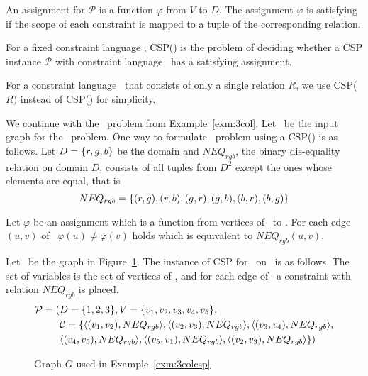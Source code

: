 An assignment for \(\mathcal{P}\) is a function \(\varphi\) from \(V\) to \(D\)\@. The assignment
\(\varphi\) is satisfying if the scope of each constraint is
mapped to a tuple of the corresponding relation.

\begin{defi}
For a fixed constraint language \mrelset, CSP(\mrelset) is the problem of deciding 
whether a CSP instance \(\mathcal{P}\) with constraint language \mrelset\
has a satisfying assignment.
\end{defi}

For a constraint language \mrelset\ that consists of only a single relation \(R\),
we use CSP(\(R)\) instead of CSP(\mrelset) for simplicity.

\begin{example}[\tcoloring]\label{exm:3colcsp}
We continue with the \tcoloring\ problem from Example~\ref{exm:3col}.
Let \mG\ be the input graph for the \tcoloring\ problem.
One way to formulate \tcoloring\ problem using a CSP(\mrelset) is as follows.
Let \(D=\{{r,g,b}\}\) be the domain and \(NEQ_{rgb}\), the binary dis-equality relation on domain \(D\)\@, consists of all tuples from \(D^2\) except the ones whose elements are equal, that is
\[NEQ_{rgb}=\{{(r,g),(r,b),(g,r),(g,b),(b,r), (b,g)}\}\]

Let \(\varphi\) be an assignment which is a function from vertices of \mG\ to \mD\@.
For each edge \((u,v)\) of \mG\, \(\varphi(u)\neq\varphi(v)\) holds which is
equivalent to \(NEQ_{rgb}(u,v)\)\@.

Let \mG\ be the graph in Figure~\ref{fig:sample}. The instance of 
CSP for \tcoloring\ on \mG\ is as follows. The set of variables is the set of vertices of \mG,
and for each edge of \mG\ a constraint with relation \(NEQ_{rgb}\) is placed.
\begin{align*}
\mathcal{P}=(&D=\{{1,2,3}\},V=\{{v_1,v_2,v_3,v_4,v_5}\}, \\
&\mathcal{C}=\{\langle (v_1,v_2),NEQ_{rgb} \rangle, \langle (v_2,v_3),NEQ_{rgb} \rangle,\langle (v_3,v_4),NEQ_{rgb} \rangle,\\
&\langle (v_4,v_5),NEQ_{rgb} \rangle, \langle (v_5,v_1),NEQ_{rgb} \rangle,
\langle (v_2,v_3),NEQ_{rgb} \rangle\})
\end{align*}
\end{example}

\begin{figure}
\centering

\caption{Graph \ensuremath{G} used in Example~\ref{exm:3colcsp}}
\label{fig:sample}
\end{figure}

